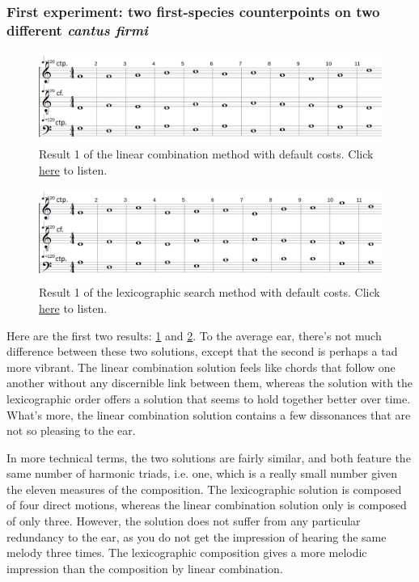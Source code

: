 \subsubsection{First experiment: two first-species counterpoints on two different \textit{cantus firmi}}
\begin{figure}[h]
    \centering
    \includegraphics[width=1\textwidth]{Images/Experiments/linear-combination-1sp.png}
    \caption{Result 1 of the linear combination method with default costs. Click \href{https://example.com/}{here} to listen.}
    \label{fig:combili-1sp}
\end{figure}

\begin{figure}[h]
    \centering
    \includegraphics[width=1\textwidth]{Images/Experiments/basic-lexico-1sp.png}
    \caption{Result 1 of the lexicographic search method with default costs. Click \href{https://youtu.be/wh1bXyVt5LI}{here} to listen.}
    \label{fig:lexico-1sp}
\end{figure}

Here are the first two results: \ref{fig:combili-1sp} and \ref{fig:lexico-1sp}. To the average ear, there's not much difference between these two solutions, except that the second is perhaps a tad more vibrant. The linear combination solution feels like chords that follow one another without any discernible link between them, whereas the solution with the lexicographic order offers a solution that seems to hold together better over time. What's more, the linear combination solution contains a few dissonances that are not so pleasing to the ear.

In more technical terms, the two solutions are fairly similar, and both feature the same number of harmonic triads, i.e. one, which is a really small number given the eleven measures of the composition. The lexicographic solution is composed of four direct motions, whereas the linear combination solution only is composed of only three. However, the solution does not suffer from any particular redundancy to the ear, as you do not get the impression of hearing the same melody three times. The lexicographic composition gives a more melodic impression than the composition by linear combination.

